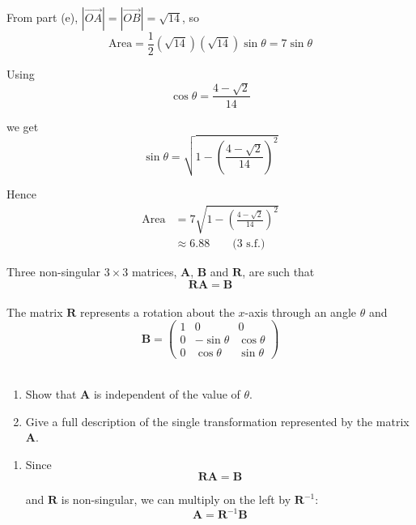 \documentclass[leqno]{article}
\begin{document}
\begin{enumerate}[
  label=\textbf{\arabic*.},
  leftmargin=*,
  topsep=0pt,
  partopsep=0pt,
  parsep=0pt
]
\begin{djsSolution}
\begin{enumerate}[label=\textbf{(\alph*)}]
From part (e), \(|\overrightarrow{OA}|=|\overrightarrow{OB}|=\sqrt{14}\), so
\[
\text{Area}
=\frac12(\sqrt{14})(\sqrt{14})\sin\theta
=7\sin\theta
\]

Using
\[
\cos\theta=\frac{4-\sqrt2}{14}
\]

we get
\[
\sin\theta=\sqrt{1-\left(\frac{4-\sqrt2}{14}\right)^2}
\]

Hence
\begin{align*}
\text{Area}
&=7\sqrt{1-\left(\frac{4-\sqrt2}{14}\right)^2} \\
&\approx 6.88\qquad\text{(3 s.f.)}
\end{align*}
\end{enumerate}
\end{djsSolution}


\newpage

\questionitem

Three non-singular $3 \times 3$ matrices, $\mathbf{A}$, $\mathbf{B}$ and $\mathbf{R}$, are such that
\[
\mathbf{R}\mathbf{A}=\mathbf{B}
\] \\
The matrix $\mathbf{R}$ represents a rotation about the $x$-axis through an angle $\theta$ and
\[
\mathbf{B}=\begin{pmatrix}
1 & 0 & 0 \\
0 & -\sin\theta & \cos\theta \\
0 & \cos\theta & \sin\theta
\end{pmatrix}
\] \\
\begin{enumerate}[label=\textbf{(\alph*)}]
  \item Show that $\mathbf{A}$ is independent of the value of $\theta$.  \\
  \item Give a full description of the single transformation represented by the matrix $\mathbf{A}$.  \\
\end{enumerate}

\vspace*{10pt}

\begin{djsSolution}
\begin{enumerate}[label=\textbf{(\alph*)}]
  \item Since
\[
\mathbf{R}\mathbf{A}=\mathbf{B}
\]

and $\mathbf{R}$ is non-singular, we can multiply on the left by $\mathbf{R}^{-1}$:
\[
\mathbf{A}=\mathbf{R}^{-1}\mathbf{B}
\]


\end{enumerate}
\end{djsSolution}
\end{enumerate}
\end{document}
